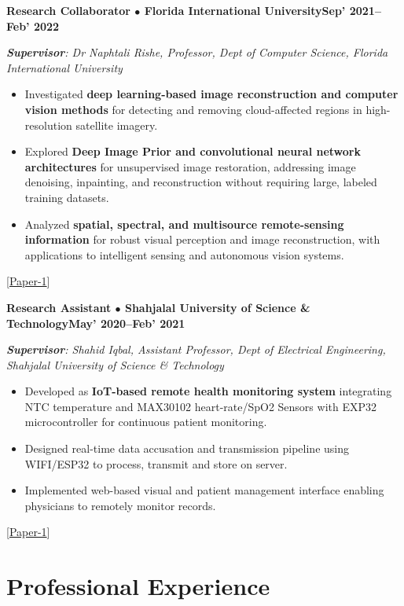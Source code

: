 \documentclass[10pt,letterpaper]{article}
\newcommand{\entry}[2]{\vspace{2pt}\par\noindent\textbf{#1}\hfill\textbf{#2}\par\nopagebreak}
\newcommand{\supv}[1]{\noindent\hspace{0.8em}\textit{\textbf{Supervisor}: #1}\par\nopagebreak}
\newcommand{\lk}[2]{[\href{#1}{#2}]}
\begin{document}
\entry{Research Collaborator $\bullet$ Florida International University}{Sep' 2021--Feb' 2022}
\supv{Dr Naphtali Rishe, Professor, Dept of Computer Science, Florida International University}
\begin{itemize}
  \item Investigated \textbf{deep learning-based image reconstruction and computer vision methods} for detecting and removing cloud-affected regions in high-resolution satellite imagery.
  \item Explored \textbf{Deep Image Prior and convolutional neural network architectures} for unsupervised image restoration, addressing image denoising, inpainting, and reconstruction without requiring large, labeled training datasets.
  \item Analyzed \textbf{spatial, spectral, and multisource remote-sensing information} for robust visual perception and image reconstruction, with applications to intelligent sensing and autonomous vision systems.
\end{itemize}
\hspace{1.6em}\lk{https://ipsitransactions.org/journals/papers/tir/2023jul/p3.php}{Paper-1}

\entry{Research Assistant $\bullet$ Shahjalal University of Science \& Technology}{May' 2020--Feb' 2021}
\supv{Shahid Iqbal, Assistant Professor, Dept of Electrical Engineering, Shahjalal University of Science \& Technology}
\begin{itemize}
  \item Developed as \textbf{IoT-based remote health monitoring system} integrating NTC temperature and MAX30102 heart-rate/SpO2 Sensors with EXP32 microcontroller for continuous patient monitoring.
  \item Designed real-time data accusation and transmission pipeline using WIFI/ESP32 to process, transmit and store on server.
  \item Implemented web-based visual and patient management interface enabling physicians to remotely monitor records.
\end{itemize}
\hspace{1.6em}\lk{https://drive.google.com/file/d/15x1p7n6dDvtg2hj9ObGUxymlGAqeHCxi/view}{Paper-1}

\section{Professional Experience}
\end{document}
